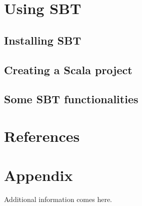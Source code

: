 \documentclass{article}
\begin{document}
\section{Using SBT}
\subsection{Installing SBT}
\subsection{Creating a Scala project}
\subsection{Some SBT functionalities}
\section{References}



\section{Appendix}
\begin{appendix}

Additional information comes here.
\listoffigures
\listoftables

\end{appendix}

  
\end{document}
